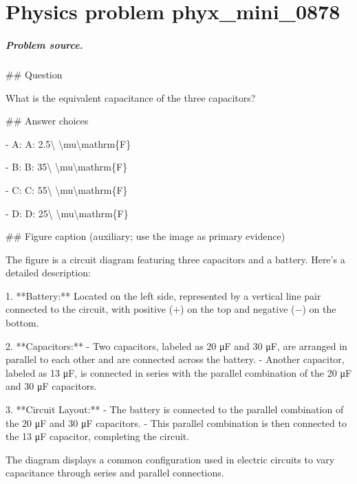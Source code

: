 
\chapter{Physics problem phyx\_mini\_0878}
\label{ch:PhyXMiniProblems_problem_phyx_mini_0878}

\paragraph{Problem source.}
\#\# Question

What is the equivalent capacitance of the three capacitors?

\#\# Answer choices

- A: A: 2.5\textbackslash{} \textbackslash{}mu\textbackslash{}mathrm\{F\}

- B: B: 35\textbackslash{} \textbackslash{}mu\textbackslash{}mathrm\{F\}

- C: C: 55\textbackslash{} \textbackslash{}mu\textbackslash{}mathrm\{F\}

- D: D: 25\textbackslash{} \textbackslash{}mu\textbackslash{}mathrm\{F\}

\#\# Figure caption (auxiliary; use the image as primary evidence)

The figure is a circuit diagram featuring three capacitors and a battery. Here's a detailed description:

1. **Battery:** Located on the left side, represented by a vertical line pair connected to the circuit, with positive (+) on the top and negative (−) on the bottom.

2. **Capacitors:**
   - Two capacitors, labeled as 20 μF and 30 μF, are arranged in parallel to each other and are connected across the battery.
   - Another capacitor, labeled as 13 μF, is connected in series with the parallel combination of the 20 μF and 30 μF capacitors.

3. **Circuit Layout:**
   - The battery is connected to the parallel combination of the 20 μF and 30 μF capacitors.
   - This parallel combination is then connected to the 13 μF capacitor, completing the circuit. 

The diagram displays a common configuration used in electric circuits to vary capacitance through series and parallel connections.

